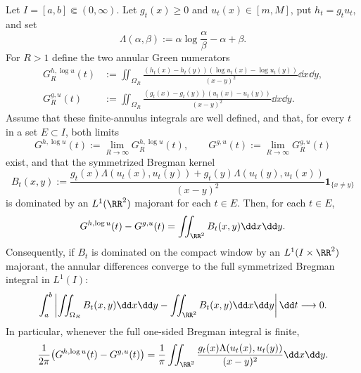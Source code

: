 \begin{lemma}%
\label{lem:annular-green-limits-close-to-full-bregman}
Let \(I=[a,b]\Subset(0,\infty)\).  Let \(g_t(x)\ge0\) and
\(u_t(x)\in[m,M]\), put \(h_t=g_tu_t\), and set
\[
\Lambda(\alpha,\beta):=\alpha\log\frac{\alpha}{\beta}-\alpha+\beta .
\]
For \(R>1\) define the two annular Green numerators
\begin{align*}
G_R^{h,\log u}(t)
&:=\iint_{\Omega_R}
\frac{(h_t(x)-h_t(y))(\log u_t(x)-\log u_t(y))}
{(x-y)^2}\dd x\dd y,\\
G_R^{g,u}(t)
&:=\iint_{\Omega_R}
\frac{(g_t(x)-g_t(y))(u_t(x)-u_t(y))}
{(x-y)^2}\dd x\dd y .
\end{align*}
Assume that these finite-annulus integrals are well defined, and that, for
every \(t\) in a set \(E\subset I\), both limits
\[
G^{h,\log u}(t):=\lim_{R\to\infty}G_R^{h,\log u}(t),
\qquad
G^{g,u}(t):=\lim_{R\to\infty}G_R^{g,u}(t)
\]
exist, and that the symmetrized Bregman kernel
\[
B_t(x,y):=
\frac{g_t(x)\Lambda(u_t(x),u_t(y))
+g_t(y)\Lambda(u_t(y),u_t(x))}
{(x-y)^2}\mathbf1_{\{x\ne y\}}
\]
is dominated by an \(L^1(\RR^2)\) majorant for each \(t\in E\).  Then, for
each \(t\in E\),
\begin{equation}\label{eq:annular-green-limits-full-sym-bregman}
G^{h,\log u}(t)-G^{g,u}(t)
=\iint_{\RR^2}B_t(x,y)\dd x\dd y .
\end{equation}
Consequently, if \(B_t\) is dominated on the compact window by an
\(L^1(I\times\RR^2)\) majorant, the annular differences converge to the full
symmetrized Bregman integral in \(L^1(I)\):
\begin{equation}\label{eq:annular-green-difference-l1-full-bregman}
\int_a^b\left|
\iint_{\Omega_R}B_t(x,y)\dd x\dd y
-\iint_{\RR^2}B_t(x,y)\dd x\dd y
\right|\dd t\longrightarrow0 .
\end{equation}
In particular, whenever the full one-sided Bregman integral is finite,
\begin{equation}\label{eq:annular-green-limits-one-sided-bregman}
\frac{1}{2\pi}\bigl(G^{h,\log u}(t)-G^{g,u}(t)\bigr)
=\frac1\pi\iint_{\RR^2}
\frac{g_t(x)\Lambda(u_t(x),u_t(y))}{(x-y)^2}\dd x\dd y .
\end{equation}
\end{lemma}

